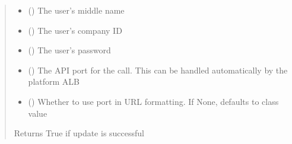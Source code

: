 \documentclass[letterpaper,10pt,english]{sphinxmanual}
\begin{document}
\begin{fulllineitems}
\begin{fulllineitems}
\begin{quote}
\begin{description}
\begin{itemize}
\item {} 
\sphinxAtStartPar
{} (\sphinxstyleliteralemphasis{\sphinxupquote{ (}}\sphinxstyleliteralemphasis{\sphinxupquote{)}}) \textendash{} The user’s middle name

\item {} 
\sphinxAtStartPar
{} (\sphinxstyleliteralemphasis{\sphinxupquote{ (}}\sphinxstyleliteralemphasis{\sphinxupquote{)}}) \textendash{} The user’s company ID

\item {} 
\sphinxAtStartPar
{} (\sphinxstyleliteralemphasis{\sphinxupquote{ (}}\sphinxstyleliteralemphasis{\sphinxupquote{)}}) \textendash{} The user’s password

\item {} 
\sphinxAtStartPar
{} (\sphinxstyleliteralemphasis{\sphinxupquote{ (}}\sphinxstyleliteralemphasis{\sphinxupquote{)}}) \textendash{} The API port for the call. This can be handled automatically by the platform ALB

\item {} 
\sphinxAtStartPar
{} (\sphinxstyleliteralemphasis{\sphinxupquote{ (}}\sphinxstyleliteralemphasis{\sphinxupquote{)}}) \textendash{} Whether to use port in URL formatting. If None, defaults to class value

\end{itemize}

\sphinxAtStartPar
{} \textendash{} Returns True if update is successful


\end{description}
\end{quote}
\end{fulllineitems}
\end{fulllineitems}
\end{document}
